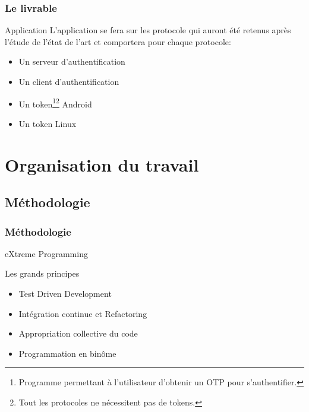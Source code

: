 \documentclass[xcolor=table]{beamer}
\begin{document}
\begin{frame}
\frametitle{Le livrable}
\begin{block}{Application}
    L'application se fera sur les protocole qui auront été retenus après l'étude de 
  l'état de l'art et comportera pour chaque protocole:
  \begin{itemize}
    \item Un serveur d'authentification
    \item Un client d'authentification
    \item Un token\footnote[1]{Programme permettant à l'utilisateur d'obtenir un 
      OTP pour s'authentifier.}\footnote[2]{Tout les protocoles ne 
      nécessitent pas de tokens.} Android
    \item Un token Linux
  \end{itemize}
\end{block}

\end{frame}


\section{Organisation du travail}

\subsection{Méthodologie}
\begin{frame}
\frametitle{Méthodologie}
\begin{center}
\Huge eXtreme Programming
\normalsize
\begin{block}{Les grands principes}
\begin{itemize}
 \item Test Driven Development
 \item Intégration continue et Refactoring
 \item Appropriation collective du code
 \item Programmation en binôme
\end{itemize}
\end{block}
\end{center}

\end{frame}
\end{document}
